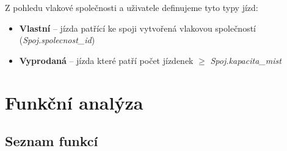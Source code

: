 \documentclass[11pt]{article}
\begin{document}
\noindent
Z pohledu vlakové společnosti a uživatele definujeme tyto typy jízd:
\begin{itemize}
    \item \textbf{Vlastní} – jízda patřící ke spoji vytvořená vlakovou společností (\textit{Spoj.spolecnost\_id})
    \item \textbf{Vyprodaná} – jízda které patří počet jízdenek $\geq$ \textit{Spoj.kapacita\_mist}
\end{itemize}

\section{Funkční analýza}

\subsection{Seznam funkcí}

\renewcommand{\labelenumii}{\theenumii}
\renewcommand{\theenumii}{\theenumi.\arabic{enumii}.}
\end{document}
